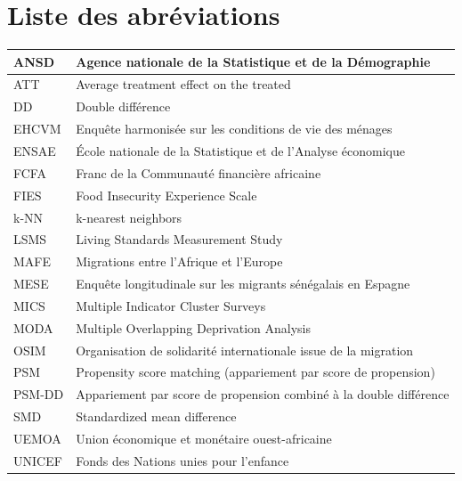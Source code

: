 \section*{Liste des abréviations}

\zebre

\begin{longtable}{|l|>{\raggedright\arraybackslash}p{11.6cm}|}
  ANSD    & Agence nationale de la Statistique et de la Démographie \\ \hline
  ATT     & Average treatment effect on the treated  \\ \hline
  DD      & Double différence \\  \hline
  EHCVM   & Enquête harmonisée sur les conditions de vie des ménages \\ \hline
  ENSAE   & École nationale de la Statistique et de l'Analyse économique \\ \hline
  FCFA    & Franc de la Communauté financière africaine \\ \hline
  FIES    & Food Insecurity Experience Scale \\ \hline
  k-NN    & k-nearest neighbors \\ \hline
  LSMS    & Living Standards Measurement Study \\ \hline
  MAFE    & Migrations entre l'Afrique et l'Europe \\ \hline
  MESE    & Enquête longitudinale sur les migrants sénégalais en Espagne \\ \hline
  MICS    & Multiple Indicator Cluster Surveys  \\ \hline
  MODA    & Multiple Overlapping Deprivation Analysis  \\ \hline
  OSIM    & Organisation de solidarité internationale issue de la migration \\ \hline
  PSM     & Propensity score matching (appariement par score de propension) \\ \hline
  PSM-DD  & Appariement par score de propension combiné à la double différence \\ \hline
  SMD     & Standardized mean difference \\ \hline
  UEMOA   & Union économique et monétaire ouest-africaine \\ \hline
  UNICEF  & Fonds des Nations unies pour l'enfance \\ \hline
\end{longtable}

\setcounter{table}{0}
